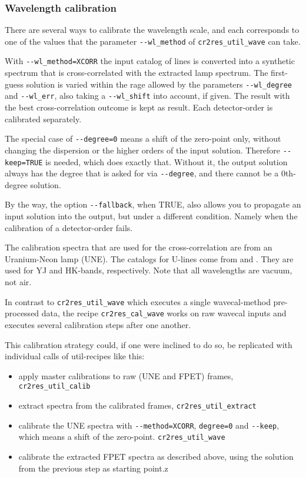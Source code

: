 \subsubsection{Wavelength calibration}

There are several ways to calibrate the wavelength scale, and each corresponds
to one of the values that the parameter \texttt{-{}-wl\_method} of
\texttt{cr2res\_util\_wave} can take.

With \texttt{-{}-wl\_method=XCORR} the input catalog of lines is converted
into a synthetic spectrum that is cross-correlated with the extracted lamp
spectrum. The first-guess solution is varied within the rage allowed by the parameters \verb!--wl_degree! and \verb!--wl_err!, also taking a \verb!--wl_shift! into account, if given. The result with the best cross-correlation outcome is kept as result.
Each detector-order is calibrated separately.

The special case of \verb!--degree=0! means a shift of the zero-point only, without changing the dispersion or the higher orders of the input solution. Therefore \verb!--keep=TRUE! is needed, which does exactly that. Without it, the output solution always has the degree that is asked for via \verb!--degree!, and there cannot be a $0$th-degree solution.

By the way, the option \verb!--fallback!, when TRUE, also allows you to propagate an input solution into the output, but under a different condition. Namely when the calibration of a detector-order fails.

The calibration spectra that are used for the cross-correlation are from an
Uranium-Neon lamp (UNE). The catalogs for U-lines come from
\cite{2018A&A...618A.118S} and \cite{2011ApJS..195...24R}. They are used for YJ
and HK-bands, respectively. Note that all wavelengths are vacuum, not air.




In contrast to \verb!cr2res_util_wave! which executes a single wavecal-method pre-processed data, the recipe \texttt{cr2res\_cal\_wave} works on raw 
wavecal inputs and executes several calibration steps after one another.

This calibration strategy could, if one were inclined to do so, be replicated with individual calls of util-recipes like this:

\begin{itemize}
    \item apply master calibrations to raw (UNE and FPET) frames, \verb!cr2res_util_calib!
    \item extract spectra from the calibrated frames, \verb!cr2res_util_extract!
    \item calibrate the UNE spectra with \verb!--method=XCORR!, \verb!degree=0! and \verb!--keep!, which means a shift of the zero-point.  \verb!cr2res_util_wave!
    \item calibrate the extracted FPET spectra as described above, using the solution from the previous step as starting point.z
    
\end{itemize}

